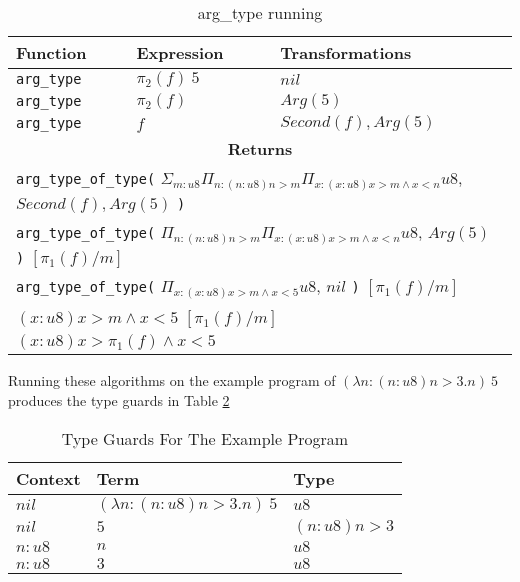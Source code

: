\begin{table}
    \centering
    \begin{tabular}{|l|l|l|}
        \hline
        \textbf{Function} & \textbf{Expression} & \textbf{Transformations}\\\hline
        \texttt{arg\_type} & $\pi_2(f)\ 5$ & $nil$\\\hline
        \texttt{arg\_type} & $\pi_2(f)$ & $Arg(5)$\\\hline
        \texttt{arg\_type} & $f$ & $Second(f), Arg(5)$\\\hline
        \multicolumn{3}{|c|}{
            \textbf{Returns}
        }\\\hline
        \multicolumn{3}{|l|}{
            \texttt{arg\_type\_of\_type(}
            $\Sigma_{m:u8} \Pi_{n:(n:u8) n > m} \Pi_{x:(x:u8) x > m \land x < n} u8$, \quad
            $Second(f), Arg(5)$
            \texttt{)}
        }\\\hline
        \multicolumn{3}{|l|}{
            \texttt{arg\_type\_of\_type(}
            $\Pi_{n:(n:u8) n > m} \Pi_{x:(x:u8) x > m \land x < n} u8$, \quad
            $Arg(5)$
            \texttt{)}
            $[\pi_1(f) / m]$
        }\\\hline
        \multicolumn{3}{|l|}{
            \texttt{arg\_type\_of\_type(}
            $\Pi_{x:(x:u8) x > m \land x < 5} u8$, \quad
            $nil$
            \texttt{)}
            $[\pi_1(f) / m]$
        }\\\hline
        \multicolumn{3}{|l|}{
            $(x:u8) x > m \land x < 5$ \quad
            $[\pi_1(f) / m]$
        }\\\hline
        \multicolumn{3}{|l|}{
            $(x:u8) x > \pi_1(f) \land x < 5$
        }\\\hline
    \end{tabular}
    \caption{arg\_type running}
    \label{tab:arg_type}
\end{table}

Running these algorithms on the example program of $(\lambda n : (n: u8) n > 3 . n)\ 5$ produces the
type guards in Table \ref{tab:example_guards}

\begin{table}
    \centering
    \begin{tabular}{|l|l|l|}
        \hline
        \textbf{Context} & \textbf{Term} & \textbf{Type}\\\hline
        $nil$ & $(\lambda n: (n: u8) n > 3 . n)\ 5$ & $u8$\\\hline
        $nil$ & $5$ & $(n: u8) n > 3$\\\hline
        $n: u8$ & $n$ & $u8$\\\hline
        $n: u8$ & $3$ & $u8$\\\hline
    \end{tabular}
    \caption{Type Guards For The Example Program}
    \label{tab:example_guards}
\end{table}

